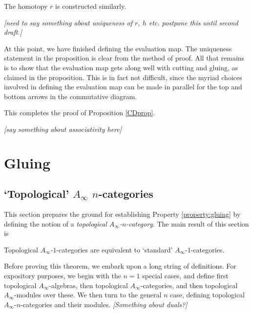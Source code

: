 \documentclass[11pt,leqno]{amsart}
\def\nn#1{{{\it \small [#1]}}}
\begin{document}
The homotopy $r$ is constructed similarly.

\nn{need to say something about uniqueness of $r$, $h$ etc.
postpone this until second draft.}

At this point, we have finished defining the evaluation map.
The uniqueness statement in the proposition is clear from the method of proof.
All that remains is to show that the evaluation map gets along well with cutting and gluing,
as claimed in the proposition.
This is in fact not difficult, since the myriad choices involved in defining the
evaluation map can be made in parallel for the top and bottom
arrows in the commutative diagram.

This completes the proof of Proposition \ref{CDprop}.

\medskip

\nn{say something about associativity here}

\section{Gluing}
\label{sec:gluing}%

\subsection{`Topological' $A_\infty$ $n$-categories}
\label{sec:topological-A-infty}%

This section prepares the ground for establishing Property \ref{property:gluing} by defining the notion of a \emph{topological $A_\infty$-$n$-category}.
The main result of this section is

\begin{thm}
Topological $A_\infty$-$1$-categories are equivalent to `standard'
$A_\infty$-$1$-categories.
\end{thm}

Before proving this theorem, we embark upon a long string of definitions. For expository purposes, we begin with the $n=1$ special cases, and define
first topological $A_\infty$-algebras, then topological $A_\infty$-categories, and then topological $A_\infty$-modules over these. We then turn
to the general $n$ case, defining topological $A_\infty$-$n$-categories and their modules.
\nn{Something about duals?}
\end{document}
